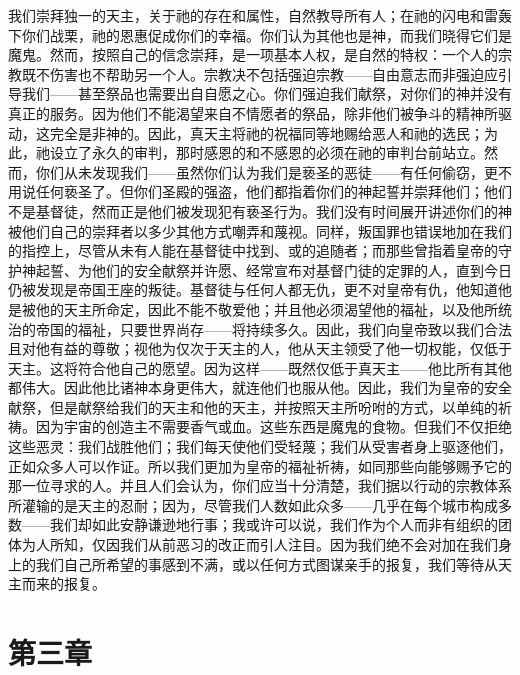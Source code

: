 我们崇拜独一的天主，关于祂的存在和属性，自然教导所有人；在祂的闪电和雷轰下你们战栗，祂的恩惠促成你们的幸福。你们认为其他也是神，而我们晓得它们是魔鬼。然而，按照自己的信念崇拜，是一项基本人权，是自然的特权：一个人的宗教既不伤害也不帮助另一个人。宗教决不包括强迫宗教——自由意志而非强迫应引导我们——甚至祭品也需要出自自愿之心。你们强迫我们献祭，对你们的神并没有真正的服务。因为他们不能渴望来自不情愿者的祭品，除非他们被争斗的精神所驱动，这完全是非神的。因此，真天主将祂的祝福同等地赐给恶人和祂的选民；为此，祂设立了永久的审判，那时感恩的和不感恩的必须在祂的审判台前站立。然而，你们从未发现我们——虽然你们认为我们是亵圣的恶徒——有任何偷窃，更不用说任何亵圣了。但你们圣殿的强盗，他们都指着你们的神起誓并崇拜他们；他们不是基督徒，然而正是他们被发现犯有亵圣行为。我们没有时间展开讲述你们的神被他们自己的崇拜者以多少其他方式嘲弄和蔑视。同样，叛国罪也错误地加在我们的指控上，尽管从未有人能在基督徒中找到、或的追随者；而那些曾指着皇帝的守护神起誓、为他们的安全献祭并许愿、经常宣布对基督门徒的定罪的人，直到今日仍被发现是帝国王座的叛徒。基督徒与任何人都无仇，更不对皇帝有仇，他知道他是被他的天主所命定，因此不能不敬爱他；并且他必须渴望他的福祉，以及他所统治的帝国的福祉，只要世界尚存——将持续多久。因此，我们向皇帝致以我们合法且对他有益的尊敬；视他为仅次于天主的人，他从天主领受了他一切权能，仅低于天主。这将符合他自己的愿望。因为这样——既然仅低于真天主——他比所有其他都伟大。因此他比诸神本身更伟大，就连他们也服从他。因此，我们为皇帝的安全献祭，但是献祭给我们的天主和他的天主，并按照天主所吩咐的方式，以单纯的祈祷。因为宇宙的创造主不需要香气或血。这些东西是魔鬼的食物。但我们不仅拒绝这些恶灵：我们战胜他们；我们每天使他们受轻蔑；我们从受害者身上驱逐他们，正如众多人可以作证。所以我们更加为皇帝的福祉祈祷，如同那些向能够赐予它的那一位寻求的人。并且人们会认为，你们应当十分清楚，我们据以行动的宗教体系所灌输的是天主的忍耐；因为，尽管我们人数如此众多——几乎在每个城市构成多数——我们却如此安静谦逊地行事；我或许可以说，我们作为个人而非有组织的团体为人所知，仅因我们从前恶习的改正而引人注目。因为我们绝不会对加在我们身上的我们自己所希望的事感到不满，或以任何方式图谋亲手的报复，我们等待从天主而来的报复。\par


\section{第三章}

